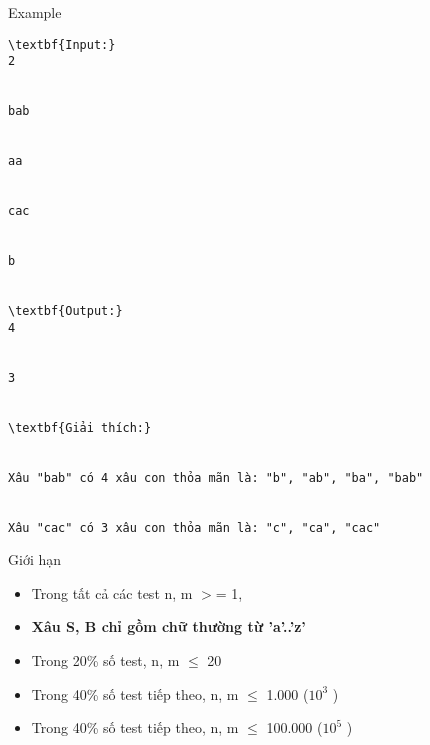 Example
\begin{verbatim}
\textbf{Input:}
2


bab


aa


cac


b


\textbf{Output:}
4


3


\textbf{Giải thích:}


Xâu "bab" có 4 xâu con thỏa mãn là: "b", "ab", "ba", "bab"


Xâu "cac" có 3 xâu con thỏa mãn là: "c", "ca", "cac" \end{verbatim}
Giới hạn
\begin{itemize}
	\item     Trong tất cả các test n, m $>$= 1,   
	\item \textbf{     Xâu S, B chỉ gồm chữ thường từ 'a'..'z'    }
	\item     Trong 20\% số test, n, m  $\le$  20   
	\item     Trong 40\% số test tiếp theo, n, m  $\le$  1.000 ($10^{3}$    )   
	\item     Trong 40\% số test tiếp theo, n, m  $\le$  100.000 ($10^{5}$    )   
\end{itemize}